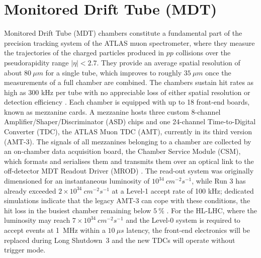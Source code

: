 \documentclass[11pt,a4paper,twoside,openright]{report}
\begin{document}
\section{Monitored Drift Tube (MDT)}
Monitored Drift Tube (MDT) chambers constitute a fundamental part of the precision tracking system of the ATLAS muon spectrometer, where they measure the trajectories of the charged particles produced in \(pp\) collisions over the pseudorapidity range \(|\eta| < 2.7\). They provide an average spatial resolution of about \(80\ \mu m\) for a single tube, which improves to roughly \(35\ \mu m\) once the measurements of a full chamber are combined. The chambers sustain hit rates as high as 300 kHz per tube with no appreciable loss of either spatial resolution or detection efficiency \cite{ATLASdesc, MDTTDCsim}.  Each chamber is equipped with up to 18 front-end boards, known as mezzanine cards. A mezzanine hosts three custom 8-channel Amplifier/Shaper/Discriminator (ASD) chips and one 24-channel Time-to-Digital Converter (TDC), the ATLAS Muon TDC (AMT), currently in its third version (AMT-3). The signals of all mezzanines belonging to a chamber are collected by an on-chamber data acquisition board, the Chamber Service Module (CSM), which formats and serialises them and transmits them over an optical link to the off-detector MDT Readout Driver (MROD) \cite{MDTTDCsim}. The read-out system was originally dimensioned for an instantaneous luminosity of \(10^{34}\ cm^{-2}s^{-1}\), while Run 3 has already exceeded \(2 \times 10^{34}\ cm^{-2}s^{-1}\) at a Level-1 accept rate of 100 kHz; dedicated simulations indicate that the legacy AMT-3 can cope with these conditions, the hit loss in the busiest chamber remaining below \(5\ \%\) \cite{MDTTDCsim}. For the HL-LHC, where the luminosity may reach \(7 \times 10^{34}~cm^{-2}s^{-1}\) and the Level-0 system is required to accept events at 1~MHz within a \(10\ \mu s\) latency, the front-end electronics will be replaced during Long Shutdown~3 and the new TDCs will operate without trigger mode.
\end{document}
